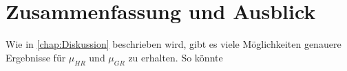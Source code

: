 \section{Zusammenfassung und Ausblick}

Wie in \autoref{chap:Diskussion} beschrieben wird, gibt es viele Möglichkeiten genauere Ergebnisse für $\mu_{HR}$ und $\mu_{GR}$ zu erhalten. So könnte 